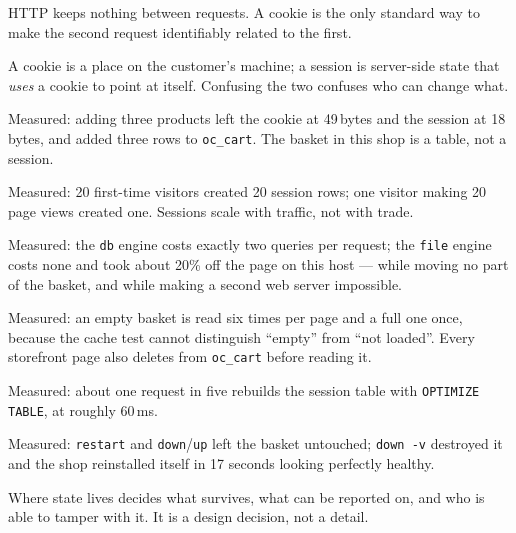 \begin{chaptersummary}
\begin{tight}
  \item HTTP keeps nothing between requests. A cookie is the only standard way
        to make the second request identifiably related to the first.
  \item A cookie is a place on the customer's machine; a session is server-side
        state that \emph{uses} a cookie to point at itself. Confusing the two
        confuses who can change what.
  \item Measured: adding three products left the cookie at 49\,bytes and the
        session at 18\,bytes, and added three rows to \texttt{oc\_cart}. The
        basket in this shop is a table, not a session.
  \item Measured: 20 first-time visitors created 20 session rows; one visitor
        making 20 page views created one. Sessions scale with traffic, not with
        trade.
  \item Measured: the \texttt{db} engine costs exactly two queries per request;
        the \texttt{file} engine costs none and took about 20\% off the page on
        this host --- while moving no part of the basket, and while making a
        second web server impossible.
  \item Measured: an empty basket is read six times per page and a full one
        once, because the cache test cannot distinguish ``empty'' from ``not
        loaded''. Every storefront page also deletes from \texttt{oc\_cart}
        before reading it.
  \item Measured: about one request in five rebuilds the session table with
        \texttt{OPTIMIZE TABLE}, at roughly 60\,ms.
  \item Measured: \texttt{restart} and \texttt{down}/\texttt{up} left the
        basket untouched; \texttt{down -v} destroyed it and the shop
        reinstalled itself in 17 seconds looking perfectly healthy.
  \item Where state lives decides what survives, what can be reported on, and
        who is able to tamper with it. It is a design decision, not a detail.
\end{tight}
\end{chaptersummary}


